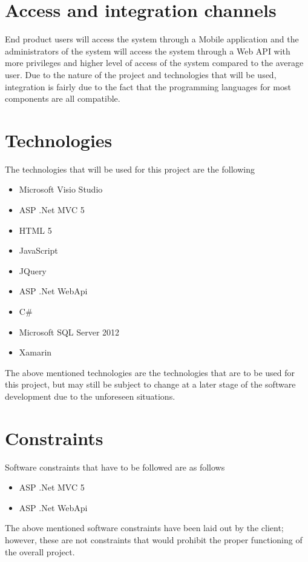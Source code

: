 \documentclass[11pt,titlepage]{article} %
\begin{document}
\section{Access and integration channels}
End product users will access the system through a Mobile application and the administrators of the system will access the system through a Web API with more privileges and higher level of access of the system compared to the average user. Due to the nature of the project and technologies that will be used, integration is fairly due to the fact that the programming languages for most components are all compatible.

\section{Technologies}
The technologies that will be used  for this project are the following
\begin{itemize}
	\item{Microsoft Visio Studio}
	\item{ASP .Net MVC 5}
	\item{HTML 5}
	\item{JavaScript}
	\item{JQuery}
	\item{ASP .Net WebApi}
	\item{C\#}
	\item{Microsoft SQL Server 2012}
	\item{Xamarin}
	\end{itemize}
The above mentioned technologies are the technologies that are to be used for this project, but may still be subject to change at a later stage of the software development due to the unforeseen situations. 



\section{Constraints}
Software constraints that have to be followed are as follows
\begin{itemize}
	\item{ASP .Net MVC 5}
	\item{ASP .Net WebApi}
\end{itemize}
The above mentioned software constraints have been laid out by the client; however, these are not constraints that would prohibit the proper functioning of the overall project.
\end{document}
